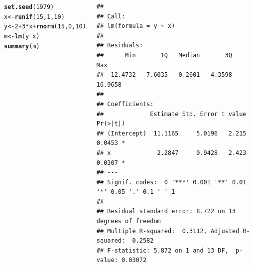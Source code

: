 \documentclass{beamer}\usepackage[]{graphicx}\usepackage[]{color}
\makeatletter
\newcommand{\hlnum}[1]{\textcolor[rgb]{0.686,0.059,0.569}{#1}}%
\newcommand{\hlopt}[1]{\textcolor[rgb]{0,0,0}{#1}}%
\newcommand{\hlstd}[1]{\textcolor[rgb]{0.345,0.345,0.345}{#1}}%
\newcommand{\hlkwb}[1]{\textcolor[rgb]{0.69,0.353,0.396}{#1}}%
\newcommand{\hlkwd}[1]{\textcolor[rgb]{0.737,0.353,0.396}{\textbf{#1}}}%
\newenvironment{kframe}{%
 \def\at@end@of@kframe{}%
 \ifinner\ifhmode%
  \def\at@end@of@kframe{\end{minipage}}%
  \begin{minipage}{\columnwidth}%
 \fi\fi%
 \def\FrameCommand##1{\hskip\@totalleftmargin \hskip-\fboxsep
 \colorbox{shadecolor}{##1}\hskip-\fboxsep
     \hskip-\linewidth \hskip-\@totalleftmargin \hskip\columnwidth}%
 \MakeFramed {\advance\hsize-\width
   \@totalleftmargin\z@ \linewidth\hsize
   \@setminipage}}%
 {\par\unskip\endMakeFramed%
 \at@end@of@kframe}
\newenvironment{knitrout}{}{} %
\renewenvironment{knitrout}{\setlength{\topsep}{0mm}}{}
\makeatother
\begin{document}
\begin{frame}[fragile]

\begin{columns}[t]


\begin{knitrout}\tiny
{}\color{fgcolor}\begin{kframe}
\begin{alltt}
\hlkwd{set.seed}\hlstd{(}\hlnum{1979}\hlstd{)}
\hlstd{x} \hlkwb{<-} \hlkwd{runif}\hlstd{(}\hlnum{15}\hlstd{,}\hlnum{1}\hlstd{,}\hlnum{10}\hlstd{)}
\hlstd{y} \hlkwb{<-} \hlnum{2} \hlopt{+} \hlnum{3}\hlopt{*}\hlstd{x} \hlopt{+} \hlkwd{rnorm}\hlstd{(}\hlnum{15}\hlstd{,}\hlnum{0}\hlstd{,}\hlnum{10}\hlstd{)}
\hlstd{m} \hlkwb{<-} \hlkwd{lm}\hlstd{(y} \hlopt{~} \hlstd{x)}
\hlkwd{summary}\hlstd{(m)}
\end{alltt}
\begin{verbatim}
## 
## Call:
## lm(formula = y ~ x)
## 
## Residuals:
##      Min       1Q   Median       3Q      Max 
## -12.4732  -7.6035   0.2601   4.3598  16.9658 
## 
## Coefficients:
##             Estimate Std. Error t value Pr(>|t|)  
## (Intercept)  11.1165     5.0196   2.215   0.0453 *
## x             2.2847     0.9428   2.423   0.0307 *
## ---
## Signif. codes:  0 '***' 0.001 '**' 0.01 '*' 0.05 '.' 0.1 ' ' 1
## 
## Residual standard error: 8.722 on 13 degrees of freedom
## Multiple R-squared:  0.3112,	Adjusted R-squared:  0.2582 
## F-statistic: 5.872 on 1 and 13 DF,  p-value: 0.03072
\end{verbatim}
\end{kframe}
\end{knitrout}



\end{columns}
\end{frame}
\end{document}
